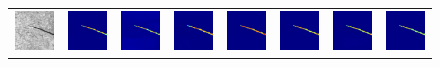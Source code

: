 \documentclass[sn-mathphys]{sn-jnl}%
\theoremstyle{thmstyleone}%
\theoremstyle{thmstyletwo}%
\theoremstyle{thmstylethree}%
\begin{document}
\begin{figure}
{\begin{tabular}{p{1.2cm}p{1.2cm}p{1.2cm}p{1.2cm}p{1.2cm}p{1.2cm}p{1.2cm}p{1.2cm}}
    \includegraphics[width=0.6in]{fig7-3.png}&
    \includegraphics[width=0.6in]{fig7-3-0.png}&
    \includegraphics[width=0.6in]{fig7-3-50.png}&
    \includegraphics[width=0.6in]{fig7-3-100.png}&
    \includegraphics[width=0.6in]{fig7-3-150.png}&
    \includegraphics[width=0.6in]{fig7-3-200.png}&
    \includegraphics[width=0.6in]{fig7-3-250.png}&
    \includegraphics[width=0.6in]{fig7-3-300.png}\\


\end{tabular}}
\end{figure}
\end{document}
